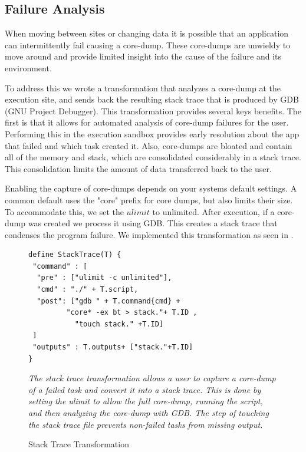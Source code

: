 \documentclass[conference]{IEEEtran}
\begin{document}
\subsection{Failure Analysis}

When moving between sites or changing data
it is possible that an application can intermittently
fail causing a core-dump.
These core-dumps are unwieldy to move around and 
provide limited insight into the cause of the failure
and its environment. 

To address this we wrote a transformation that analyzes 
a core-dump at the execution site, and sends back the
resulting stack trace that is produced by GDB (GNU Project Debugger).
This transformation provides several keys benefits.
The first is that it allows for automated analysis of
core-dump failures for the user. Performing this in the 
execution sandbox provides early resolution about the
app that failed and which task created it.
Also, core-dumps are bloated and 
contain all of the memory and stack,
which are consolidated considerably in
a stack trace. 
This consolidation limits the amount of data 
transferred back to the user. 


Enabling the capture of core-dumps depends
on your systems default settings.
A common default uses the "core" prefix for
core dumps, but also limits their size. 
To accommodate this, we set the $ulimit$
to unlimited. After execution, if a 
core-dump was created we process it using GDB.
This creates a stack trace that condenses
the program failure.
We implemented this transformation as 
seen in .

\begin{figure}[H]
\begin{framed}
\small
\begin{verbatim}
define StackTrace(T) {
 "command" : [
  "pre" : ["ulimit -c unlimited"],
  "cmd" : "./" + T.script,
  "post": ["gdb " + T.command{cmd} +
         "core* -ex bt > stack."+ T.ID ,
           "touch stack." +T.ID]
 ]
 "outputs" : T.outputs+ ["stack."+T.ID]
}
\end{verbatim}
\end{framed}
\caption{Stack Trace Transformation}
\small
\emph{The stack trace transformation allows a user
to capture a core-dump of a failed task and 
convert it into a stack trace. 
This is done by setting the ulimit 
to allow the full core-dump, running the script,
and then analyzing the core-dump with GDB.
The step of touching the stack trace
file prevents non-failed tasks from missing output.}
\label{stacktrace}
\end{figure}
\end{document}

